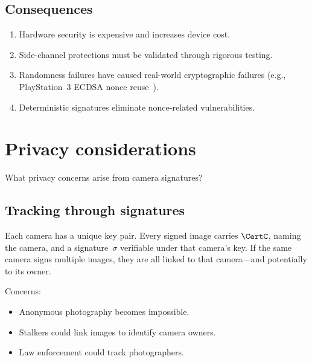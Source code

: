 \subsection{Consequences}

\begin{enumerate}
  \item Hardware security is expensive and increases device cost.
  \item Side-channel protections must be validated through rigorous
    testing.
  \item Randomness failures have caused real-world cryptographic
    failures (e.g., PlayStation~3 ECDSA nonce
    reuse~\autocite{fail0verflow2010}).
  \item Deterministic signatures eliminate nonce-related vulnerabilities.
\end{enumerate}


\section{Privacy considerations}\label{CameraPrivacy}


\begin{exercise}
  What privacy concerns arise from camera signatures?
\end{exercise}

\subsection{Tracking through signatures}

Each camera has a unique key pair.
Every signed image carries \(\CertC\), naming the camera, and a
signature~\(\sigma\) verifiable under that camera's key.
If the same camera signs multiple images, they are all linked to that
camera---and potentially to its owner.

Concerns:
\begin{itemize}
  \item Anonymous photography becomes impossible.
  \item Stalkers could link images to identify camera owners.
  \item Law enforcement could track photographers.
\end{itemize}

